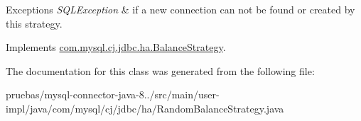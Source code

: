 \begin{DoxyExceptions}{Exceptions}
{\em S\+Q\+L\+Exception} & if a new connection can not be found or created by this strategy. \\
\hline
\end{DoxyExceptions}


Implements \mbox{\hyperlink{interfacecom_1_1mysql_1_1cj_1_1jdbc_1_1ha_1_1_balance_strategy_a754b8e7a4e4baad812f650b3222cfbd5}{com.\+mysql.\+cj.\+jdbc.\+ha.\+Balance\+Strategy}}.



The documentation for this class was generated from the following file\+:\begin{DoxyCompactItemize}
\item 
pruebas/mysql-\/connector-\/java-\/8../src/main/user-\/impl/java/com/mysql/cj/jdbc/ha/Random\+Balance\+Strategy.\+java\end{DoxyCompactItemize}
